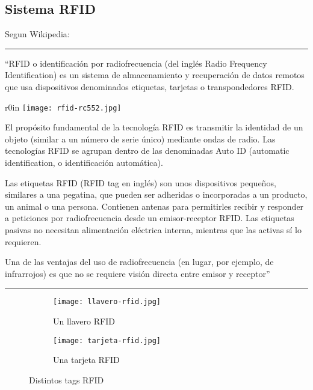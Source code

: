 \documentclass[../informe_krapp.tex]{subfiles}
\begin{document}
\clearpage
\subsection{Sistema RFID}
Segun Wikipedia\cite{wikipedia_rfid_es}:

\begin{center}
	\rule{0.8\textwidth}{0.3pt}
\end{center}
``RFID o identificación por radiofrecuencia
(del inglés Radio Frequency Identification) es un sistema de almacenamiento y recuperación
de datos remotos que usa dispositivos denominados etiquetas, tarjetas o transpondedores
RFID.

\begin{wrapfigure}{r}{0in}
	\centering
	\texttt{[image: rfid-rc552.jpg]}
\end{wrapfigure}

El propósito fundamental de la tecnología RFID es transmitir la identidad de
un objeto (similar a un número de serie único) mediante ondas de radio. Las tecnologías
RFID se agrupan dentro de las denominadas Auto ID (automatic identification,
o identificación automática).

Las etiquetas RFID (RFID tag en inglés) son unos dispositivos pequeños, similares
a una pegatina, que pueden ser adheridas o incorporadas a un producto, un animal
o una persona. Contienen antenas para permitirles recibir y responder a peticiones
por radiofrecuencia desde un emisor-receptor RFID. Las etiquetas pasivas no necesitan
alimentación eléctrica interna, mientras que las activas sí lo requieren.

Una de las ventajas del uso de radiofrecuencia (en lugar, por ejemplo, de infrarrojos)
es que no se requiere visión directa entre emisor y receptor''

\begin{center}
	\rule{0.8\textwidth}{0.3pt}
\end{center}

\begin{figure}[H]
	\centering
	\begin{subfigure}{0.4\textwidth}
		\texttt{[image: llavero-rfid.jpg]}
		\caption{Un llavero RFID}
	\end{subfigure}
	\begin{subfigure}{0.4\textwidth}
		\texttt{[image: tarjeta-rfid.jpg]}
		\caption{Una tarjeta RFID}
	\end{subfigure}
	\caption{Distintos tags RFID}
\end{figure}
\end{document}
